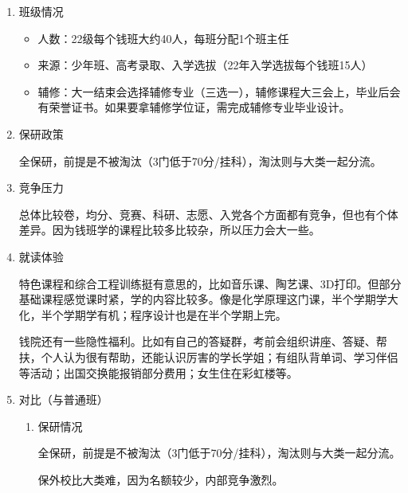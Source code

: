 \documentclass[zihao=-4,fontset=none]{Beautybook-CN}
\begin{document}
\begin{enumerate}
			
	\item 班级情况
	      \begin{itemize}
	      	\item 人数：22级每个钱班大约40人，每班分配1个班主任
	      	      	      
	      	\item 来源：少年班、高考录取、入学选拔（22年入学选拔每个钱班15人）
	      	      	      
	      	\item 辅修：大一结束会选择辅修专业（三选一），辅修课程大三会上，毕业后会有荣誉证书。如果要拿辅修学位证，需完成辅修专业毕业设计。    
	      \end{itemize}	      
	        	      
	\item 保研政策
	      	      	      
	      全保研，前提是不被淘汰（3门低于70分/挂科），淘汰则与大类一起分流。
	      	      	      
	\item 竞争压力
	      	      	      
	      总体比较卷，均分、竞赛、科研、志愿、入党各个方面都有竞争，但也有个体差异。因为钱班学的课程比较多比较杂，所以压力会大一些。
	      	      	      
	\item 就读体验
	      	      	      
	      特色课程和综合工程训练挺有意思的，比如音乐课、陶艺课、3D打印。但部分基础课程感觉课时紧，学的内容比较多。像是化学原理这门课，半个学期学大化，半个学期学有机；程序设计也是在半个学期上完。
	      	      
	      钱院还有一些隐性福利。比如有自己的答疑群，考前会组织讲座、答疑、帮扶，个人认为很有帮助，还能认识厉害的学长学姐；有组队背单词、学习伴侣等活动；出国交换能报销部分费用；女生住在彩虹楼等。
	      	      	      
	\item 对比（与普通班）
	      	      	      
	      \begin{enumerate}
	      	\item 保研情况
	      	      	      	      	      	      
	      	      全保研，前提是不被淘汰（3门低于70分/挂科），淘汰则与大类一起分流。
	      	      	      	      
	      	      保外校比大类难，因为名额较少，内部竞争激烈。
	      	      	      	      	      	      

\end{enumerate}
\end{enumerate}
\end{document}
